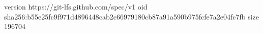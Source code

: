 version https://git-lfs.github.com/spec/v1
oid sha256:b55e25fc9f971d4896448cab2c66979180cb87a91a590b975fcfe7a2e04fc7fb
size 196704

